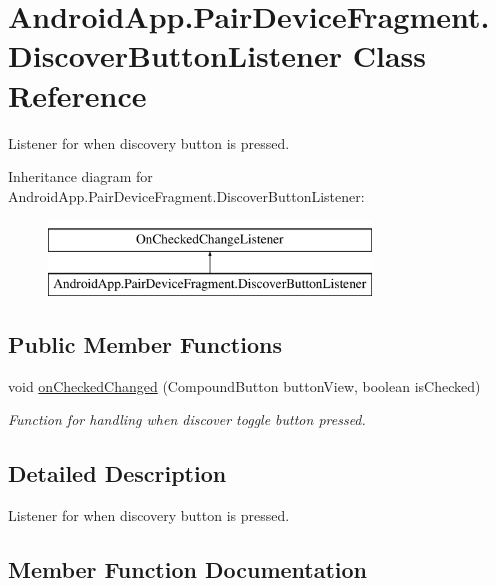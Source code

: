\hypertarget{class_android_app_1_1_pair_device_fragment_1_1_discover_button_listener}{}\section{Android\+App.\+Pair\+Device\+Fragment.\+Discover\+Button\+Listener Class Reference}
\label{class_android_app_1_1_pair_device_fragment_1_1_discover_button_listener}


Listener for when discovery button is pressed.  


Inheritance diagram for Android\+App.\+Pair\+Device\+Fragment.\+Discover\+Button\+Listener\+:\begin{figure}[H]
\begin{center}
\leavevmode
\includegraphics[height=2.000000cm]{class_android_app_1_1_pair_device_fragment_1_1_discover_button_listener}
\end{center}
\end{figure}
\subsection*{Public Member Functions}
\begin{DoxyCompactItemize}
\item 
void \hyperlink{class_android_app_1_1_pair_device_fragment_1_1_discover_button_listener_acda5197960ecaeaa1f98603e97a36bce}{on\+Checked\+Changed} (Compound\+Button button\+View, boolean is\+Checked)
\begin{DoxyCompactList}\small\item\em Function for handling when discover toggle button pressed. \end{DoxyCompactList}\end{DoxyCompactItemize}


\subsection{Detailed Description}
Listener for when discovery button is pressed. 

\subsection{Member Function Documentation}
\mbox{\label{class_android_app_1_1_pair_device_fragment_1_1_discover_button_listener_acda5197960ecaeaa1f98603e97a36bce}} 
